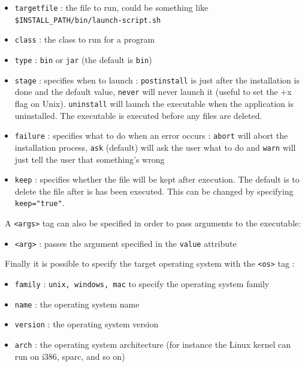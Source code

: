 \begin{itemize}
\begin{itemize}
\begin{itemize}
      \item \texttt{targetfile} : the file to run, could be something like\\
      \texttt{\$INSTALL\_PATH/bin/launch-script.sh}
      \item \texttt{class} : the class to run for a \Java program
      \item \texttt{type} : \texttt{bin} or \texttt{jar} (the default is
      \texttt{bin})
      \item \texttt{stage} : specifies when to launch : \texttt{postinstall}
      is just after the installation is done and the default value,
      \texttt{never} will never launch it (useful to set the +x flag on Unix).
      \texttt{uninstall} will launch the executable when the application
      is uninstalled. The executable is executed before any files are deleted.
      \item \texttt{failure} : specifies what to do when an error occurs :
      \texttt{abort} will abort the installation process, \texttt{ask} (default)
      will ask the user what to do and \texttt{warn} will just tell the user
      that something's wrong
      \item \texttt{keep} : specifies whether the file will be kept after
      execution. The default is to delete the file after is has been executed.
      This can be changed by specifying \texttt{keep="true"}.
    
    \end{itemize}\
    A \texttt{<args>} tag can also be specified in order to pass
    arguments to the executable:
    \begin{itemize}
    
      \item \texttt{<arg>} : passes the argument specified in the
      \texttt{value} attribute
    
    \end{itemize}\
    Finally it is possible to specify the target operating system with the
    \texttt{<os>} tag :
    \begin{itemize}
    
      \item \texttt{family} : \texttt{unix, windows, mac} to specify the
      operating system family
      \item \texttt{name} : the operating system name
      \item \texttt{version} : the operating system version
      \item \texttt{arch} : the operating system architecture (for instance the
      Linux kernel can run on i386, sparc, and so on)
    
    \end{itemize}\
  
  \end{itemize}\

\end{itemize}\

